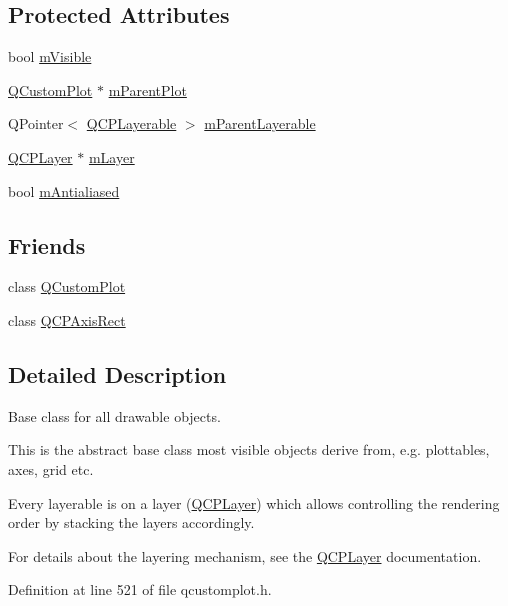 \subsection*{Protected Attributes}
\begin{DoxyCompactItemize}
\item 
bool \hyperlink{class_q_c_p_layerable_a62e3aed8427d6ce3ccf716f285106cb3}{m\+Visible}
\item 
\hyperlink{class_q_custom_plot}{Q\+Custom\+Plot} $\ast$ \hyperlink{class_q_c_p_layerable_aa2a528433e44db02b8aef23c1f9f90ed}{m\+Parent\+Plot}
\item 
Q\+Pointer$<$ \hyperlink{class_q_c_p_layerable}{Q\+C\+P\+Layerable} $>$ \hyperlink{class_q_c_p_layerable_a3291445a980053e2d17a21d15957624e}{m\+Parent\+Layerable}
\item 
\hyperlink{class_q_c_p_layer}{Q\+C\+P\+Layer} $\ast$ \hyperlink{class_q_c_p_layerable_aa38ec5891aff0f50b36fd63e9372a0cd}{m\+Layer}
\item 
bool \hyperlink{class_q_c_p_layerable_a3ab45a4c76a3333ce42eb217a81733ec}{m\+Antialiased}
\end{DoxyCompactItemize}
\subsection*{Friends}
\begin{DoxyCompactItemize}
\item 
class \hyperlink{class_q_c_p_layerable_a1cdf9df76adcfae45261690aa0ca2198}{Q\+Custom\+Plot}
\item 
class \hyperlink{class_q_c_p_layerable_acbf20ecb140f66c5fd1bc64ae0762990}{Q\+C\+P\+Axis\+Rect}
\end{DoxyCompactItemize}


\subsection{Detailed Description}
Base class for all drawable objects. 

This is the abstract base class most visible objects derive from, e.\+g. plottables, axes, grid etc.

Every layerable is on a layer (\hyperlink{class_q_c_p_layer}{Q\+C\+P\+Layer}) which allows controlling the rendering order by stacking the layers accordingly.

For details about the layering mechanism, see the \hyperlink{class_q_c_p_layer}{Q\+C\+P\+Layer} documentation. 

Definition at line 521 of file qcustomplot.\+h.



